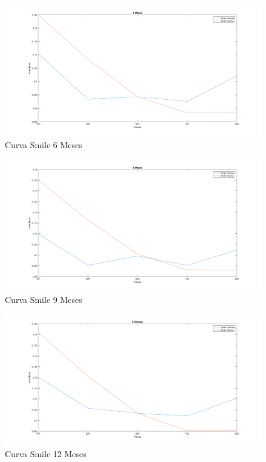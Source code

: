 \begin{figure}[H]
    \begin{center}
    \includegraphics[width = 14cm]{figures/Smile2d6Meses.png}
    \caption{Curva Smile 6 Meses}
    \label{3SmileDia1} %
    \end{center}
\end{figure}
\begin{figure}[H]
    \begin{center}
    \includegraphics[width = 14cm]{figures/Smile2d9Meses.png}
    \caption{Curva Smile 9 Meses}
    \label{4SmileDia1} %
    \end{center}
\end{figure}
\begin{figure}[H]
    \begin{center}
    \includegraphics[width = 14cm]{figures/Smile2d12Meses.png}
    \caption{Curva Smile 12 Meses}
    \label{5SmileDia1} %
    \end{center}
\end{figure}
\newpage